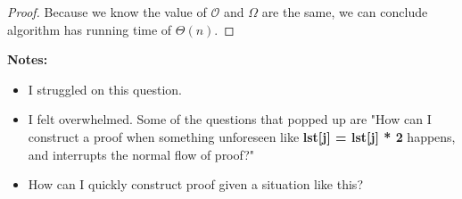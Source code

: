 \documentclass[12pt]{article}
\begin{document}
\begin{enumerate}[a.]
\begin{proof}
        \bigskip

        Because we know the value of $\mathcal{O}$ and $\Omega$ are the same,
        we can conclude algorithm has running time of $\Theta(n)$.
    \end{proof}

    \bigskip

    \textbf{Notes:}

    \begin{itemize}
        \item I struggled on this question.
        \item I felt overwhelmed. Some of the questions that popped up are
        "How can I construct a proof when something unforeseen like \textbf{lst[j] = lst[j] * 2}
        happens, and interrupts the normal flow of proof?"
        \item How can I quickly construct proof given a situation like this?
    \end{itemize}

\end{enumerate}
\end{document}
